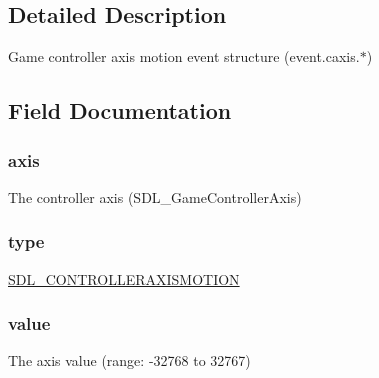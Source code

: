 \subsection{Detailed Description}
Game controller axis motion event structure (event.\+caxis.$\ast$) 

\subsection{Field Documentation}
\subsubsection[{\texorpdfstring{axis}{axis}}]{ axis}\hypertarget{struct_s_d_l___controller_axis_event_a911494630318160a9e7ad91e3fe7e6a0}{}\label{struct_s_d_l___controller_axis_event_a911494630318160a9e7ad91e3fe7e6a0}
The controller axis (S\+D\+L\+\_\+\+Game\+Controller\+Axis) 
\subsubsection[{\texorpdfstring{type}{type}}]{ type}\hypertarget{struct_s_d_l___controller_axis_event_aa40a9b05c3154032b9f2d7220e9f08dc}{}\label{struct_s_d_l___controller_axis_event_aa40a9b05c3154032b9f2d7220e9f08dc}
\hyperlink{_s_d_l__events_8h_a3b589e89be6b35c02e0dd34a55f3fccaaca6330126f4126f6a45454fa046c25f3}{S\+D\+L\+\_\+\+C\+O\+N\+T\+R\+O\+L\+L\+E\+R\+A\+X\+I\+S\+M\+O\+T\+I\+ON} 
\subsubsection[{\texorpdfstring{value}{value}}]{ value}\hypertarget{struct_s_d_l___controller_axis_event_ae36d960bffe70dcf148258f6dbcb0ef8}{}\label{struct_s_d_l___controller_axis_event_ae36d960bffe70dcf148258f6dbcb0ef8}
The axis value (range\+: -\/32768 to 32767) 
